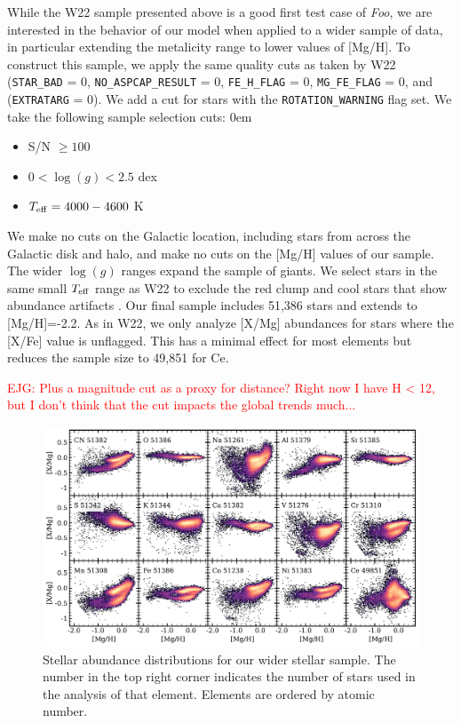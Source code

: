 \documentclass[modern]{aastex631}
\newcommand{\logg}{\log(g)}
\newcommand{\teff}{T_{\rm eff}}
\newcommand{\ejg}[1]{\textcolor{red}{EJG: #1}}
\newcommand{\name}{\textsl{Foo}} %
\begin{document}
While the W22 sample presented above is a good first test case of \name, we are interested in the behavior of our model when applied to a wider sample of data, in particular extending the metalicity range to lower values of [Mg/H]. To construct this sample, we apply the same quality cuts as taken by W22 (\texttt{STAR\_BAD} = 0, \texttt{NO\_ASPCAP\_RESULT} = 0, \texttt{FE\_H\_FLAG} = 0, \texttt{MG\_FE\_FLAG} = 0, and (\texttt{EXTRATARG} = 0). We add a cut for stars with the \texttt{ROTATION\_WARNING} flag set. We take the following sample selection cuts: 
\itemsep0em
\begin{itemize}
    \item S/N $\geq 100$
    \item $0 < \logg < 2.5$ dex
    \item $\teff = 4000-4600$ K
\end{itemize}
We make no cuts on the Galactic location, including stars from across the Galactic disk and halo, and make no cuts on the [Mg/H] values of our sample. The wider $\logg$ ranges expand the sample of giants. We select stars in the same small $\teff$ range as W22 to exclude the red clump \citep{vincenzo2021} and cool stars that show abundance artifacts \citep{jonsson2020}.
Our final sample includes 51,386 stars and extends to [Mg/H]=-2.2. As in W22, we only analyze [X/Mg] abundances for stars where the [X/Fe] value is unflagged. This has a minimal effect for most elements but reduces the sample size to 49,851 for Ce. 

\ejg{Plus a magnitude cut as a proxy for distance? Right now I have H < 12, but I don't think that the cut impacts the global trends much...}

\begin{figure}[htb!]
    \centering
    \includegraphics[width=\textwidth]{Figures/xmg.pdf}
    \caption{Stellar abundance distributions for our wider stellar sample. The number in the top right corner indicates the number of stars used in the analysis of that element. Elements are ordered by atomic number.}
    \label{fig:w22_xmg}
\end{figure}
\end{document}
